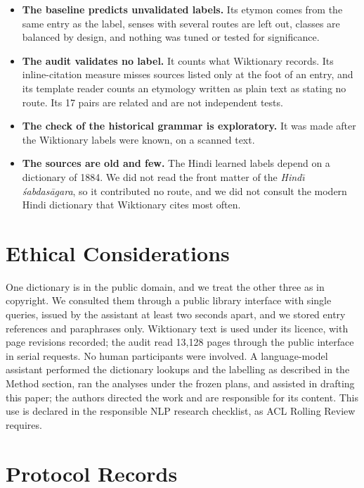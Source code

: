 \documentclass[11pt]{article}
\begin{document}
\begin{itemize}
\item \textbf{The baseline predicts unvalidated labels.} Its etymon comes from the same entry as the label, senses with several routes are left out, classes are balanced by design, and nothing was tuned or tested for significance.
\item \textbf{The audit validates no label.} It counts what Wiktionary records. Its inline-citation measure misses sources listed only at the foot of an entry, and its template reader counts an etymology written as plain text as stating no route. Its 17 pairs are related and are not independent tests.
\item \textbf{The check of the historical grammar is exploratory.} It was made after the Wiktionary labels were known, on a scanned text.
\item \textbf{The sources are old and few.} The Hindi learned labels depend on a dictionary of 1884. We did not read the front matter of the \textit{Hind\=\i{} \'sabdas\=agara}, so it contributed no route, and we did not consult the modern Hindi dictionary that Wiktionary cites most often.
\end{itemize}

\section*{Ethical Considerations}

One dictionary is in the public domain, and we treat the other three as in copyright. We consulted them through a public library interface with single queries, issued by the assistant at least two seconds apart, and we stored entry references and paraphrases only. Wiktionary text is used under its licence, with page revisions recorded; the audit read 13,128 pages through the public interface in serial requests. No human participants were involved. A language-model assistant performed the dictionary lookups and the labelling as described in the Method section, ran the analyses under the frozen plans, and assisted in drafting this paper; the authors directed the work and are responsible for its content. This use is declared in the responsible NLP research checklist, as ACL Rolling Review requires.



\appendix

\section{Protocol Records}
\label{app:records}
\end{document}
